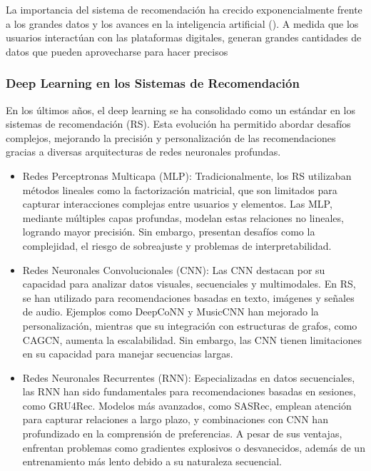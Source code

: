 La importancia del sistema de recomendación ha crecido exponencialmente frente a los grandes datos y los avances en la inteligencia artificial (\cite{adomavicius2005, ricci2022}). A medida que los usuarios interactúan con las plataformas digitales, generan grandes cantidades de datos que pueden aprovecharse para hacer precisos



\subsubsection{Deep Learning en los Sistemas de Recomendación}
En los últimos años, el deep learning se ha consolidado como un estándar en los sistemas de recomendación (RS). Esta evolución ha permitido abordar desafíos complejos, mejorando la precisión y personalización de las recomendaciones gracias a diversas arquitecturas de redes neuronales profundas.

\begin{itemize}
    \item Redes Perceptronas Multicapa (MLP): Tradicionalmente, los RS utilizaban métodos lineales como la factorización matricial, que son limitados para capturar interacciones complejas entre usuarios y elementos. Las MLP, mediante múltiples capas profundas, modelan estas relaciones no lineales, logrando mayor precisión. Sin embargo, presentan desafíos como la complejidad, el riesgo de sobreajuste y problemas de interpretabilidad.
    \item Redes Neuronales Convolucionales (CNN): Las CNN destacan por su capacidad para analizar datos visuales, secuenciales y multimodales. En RS, se han utilizado para recomendaciones basadas en texto, imágenes y señales de audio. Ejemplos como DeepCoNN y MusicCNN han mejorado la personalización, mientras que su integración con estructuras de grafos, como CAGCN, aumenta la escalabilidad. Sin embargo, las CNN tienen limitaciones en su capacidad para manejar secuencias largas.
    \item Redes Neuronales Recurrentes (RNN): Especializadas en datos secuenciales, las RNN han sido fundamentales para recomendaciones basadas en sesiones, como GRU4Rec. Modelos más avanzados, como SASRec, emplean atención para capturar relaciones a largo plazo, y combinaciones con CNN han profundizado en la comprensión de preferencias. A pesar de sus ventajas, enfrentan problemas como gradientes explosivos o desvanecidos, además de un entrenamiento más lento debido a su naturaleza secuencial.
\end{itemize}


